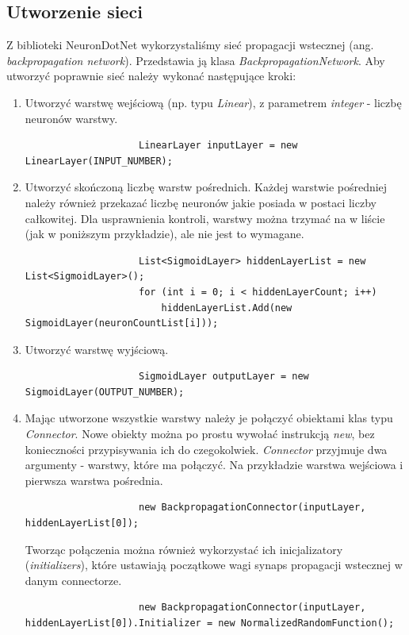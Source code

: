 \documentclass[a4paper]{article}
\begin{document}
		\subsection{Utworzenie sieci}\label{subsec:createNet}\indent\indent
			Z biblioteki NeuronDotNet wykorzystaliśmy sieć propagacji wstecznej (ang. \emph{backpropagation network}). Przedstawia ją klasa \textit{BackpropagationNetwork}. Aby utworzyć poprawnie sieć należy wykonać następujące kroki:
			\begin{enumerate}
				\item Utworzyć warstwę wejściową (np. typu \textit{Linear}), z parametrem \textit{integer} - liczbę neuronów warstwy.
				\begin{lstlisting}
					LinearLayer inputLayer = new LinearLayer(INPUT_NUMBER);
				\end{lstlisting}
				\item Utworzyć skończoną liczbę warstw pośrednich. Każdej warstwie pośredniej należy również przekazać liczbę neuronów jakie posiada w postaci liczby całkowitej. Dla usprawnienia kontroli, warstwy można trzymać na w liście (jak w poniższym przykładzie), ale nie jest to wymagane.
				\begin{lstlisting}
					List<SigmoidLayer> hiddenLayerList = new List<SigmoidLayer>();
					for (int i = 0; i < hiddenLayerCount; i++)
						hiddenLayerList.Add(new SigmoidLayer(neuronCountList[i]));
				\end{lstlisting}
				\item Utworzyć warstwę wyjściową.
				\begin{lstlisting}
					SigmoidLayer outputLayer = new SigmoidLayer(OUTPUT_NUMBER);
				\end{lstlisting}
				\item Mając utworzone wszystkie warstwy należy je połączyć obiektami klas typu \textit{Connector}. Nowe obiekty można po prostu wywołać instrukcją \textit{new}, bez konieczności przypisywania ich do czegokolwiek. \textit{Connector} przyjmuje dwa argumenty - warstwy, które ma połączyć. Na przykładzie warstwa wejściowa i pierwsza warstwa pośrednia.
				\begin{lstlisting}
					new BackpropagationConnector(inputLayer, hiddenLayerList[0]);
				\end{lstlisting}
				Tworząc połączenia można również wykorzystać ich inicjalizatory (\emph{initializers}), które ustawiają początkowe wagi synaps propagacji wstecznej w danym connectorze.
				\begin{lstlisting}
					new BackpropagationConnector(inputLayer, hiddenLayerList[0]).Initializer = new NormalizedRandomFunction();

\end{lstlisting}
\end{enumerate}
\end{document}

